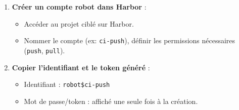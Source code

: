 \begin{enumerate}
	\item \textbf{Créer un compte robot dans Harbor} :
	      \begin{itemize}
		      \item Accéder au projet ciblé sur Harbor.
		      \item Nommer le compte (ex: \texttt{ci-push}), définir les permissions nécessaires (\texttt{push}, \texttt{pull}).
	      \end{itemize}

	\item \textbf{Copier l’identifiant et le token généré} :
	      \begin{itemize}
		      \item Identifiant : \texttt{robot\$ci-push}
		      \item Mot de passe/token : affiché une seule fois à la création.
	      \end{itemize}


\end{enumerate}
